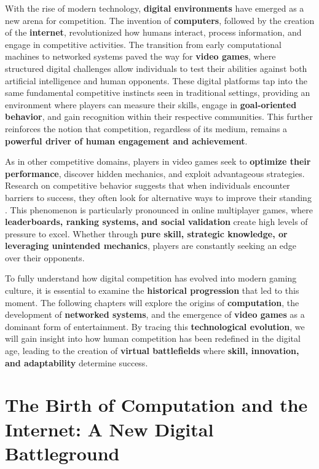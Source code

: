 With the rise of modern technology, \textbf{digital environments} have emerged as a new arena for competition. The invention of \textbf{computers}, followed by the creation of the \textbf{internet}, revolutionized how humans interact, process information, and engage in competitive activities. The transition from early computational machines to networked systems paved the way for \textbf{video games}, where structured digital challenges allow individuals to test their abilities against both artificial intelligence and human opponents. These digital platforms tap into the same fundamental competitive instincts seen in traditional settings, providing an environment where players can measure their skills, engage in \textbf{goal-oriented behavior}, and gain recognition within their respective communities. This further reinforces the notion that competition, regardless of its medium, remains a \textbf{powerful driver of human engagement and achievement}.

As in other competitive domains, players in video games seek to \textbf{optimize their performance}, discover hidden mechanics, and exploit advantageous strategies. Research on competitive behavior suggests that when individuals encounter barriers to success, they often look for alternative ways to improve their standing \parencite{murdock2001cheating}. This phenomenon is particularly pronounced in online multiplayer games, where \textbf{leaderboards, ranking systems, and social validation} create high levels of pressure to excel. Whether through \textbf{pure skill, strategic knowledge, or leveraging unintended mechanics}, players are constantly seeking an edge over their opponents.

To fully understand how digital competition has evolved into modern gaming culture, it is essential to examine the \textbf{historical progression} that led to this moment. The following chapters will explore the origins of \textbf{computation}, the development of \textbf{networked systems}, and the emergence of \textbf{video games} as a dominant form of entertainment. By tracing this \textbf{technological evolution}, we will gain insight into how human competition has been redefined in the digital age, leading to the creation of \textbf{virtual battlefields} where \textbf{skill, innovation, and adaptability} determine success.

\section{The Birth of Computation and the Internet: A New Digital Battleground}

